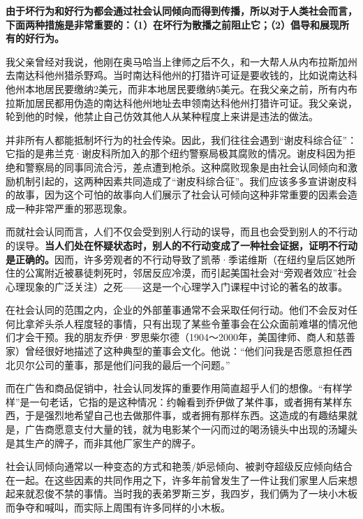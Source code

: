 \textbf{由于坏行为和好行为都会通过社会认同倾向而得到传播，所以对于人类社会而言，下面两种措施是非常重要的：（1）在坏行为散播之前阻止它；（2）倡导和展现所有的好行为。}
\par

我父亲曾经对我说，他刚在奥马哈当上律师之后不久，和一大帮人从内布拉斯加州去南达科他州猎杀野鸡。当时南达科他州的打猎许可证是要收钱的，比如说南达科他州本地居民要缴纳2美元，而非本地居民要缴纳5美元。在我父亲之前，所有内布拉斯加居民都用伪造的南达科他州地址去申领南达科他州打猎许可证。我父亲说，轮到他的时候，他禁止自己仿效其他人从某种程度上来讲是违法的做法。
\par

并非所有人都能抵制坏行为的社会传染。因此，我们往往会遇到“谢皮科综合征”：它指的是弗兰克·谢皮科所加入的那个纽约警察局极其腐败的情况。谢皮科因为拒绝和警察局的同事同流合污，差点遭到枪杀。这种腐败现象是由社会认同倾向和激励机制引起的，这两种因素共同造成了“谢皮科综合征”。我们应该多多宣讲谢皮科的故事，因为这个可怕的故事向人们展示了社会认可倾向这种非常重要的因素会造成一种非常严重的邪恶现象。
\par

而就社会认同而言，人们不仅会受到别人行动的误导，而且也会受到别人的不行动的误导。\textbf{当人们处在怀疑状态时，别人的不行动变成了一种社会证据，证明不行动是正确的。}因而，许多旁观者的不行动导致了凯蒂·季诺维斯（在纽约皇后区她所住的公寓附近被暴徒刺死时，邻居反应冷漠，而引起美国社会对“旁观者效应”社会心理现象的广泛关注）之死——这是一个心理学入门课程中讨论的著名的故事。
\par

在社会认同的范围之内，企业的外部董事通常不会采取任何行动。他们不会反对任何比拿斧头杀人程度轻的事情，只有出现了某些令董事会在公众面前难堪的情况他们才会干预。我的朋友乔伊·罗思柴尔德（1904～2000年，美国律师、商人和慈善家）曾经很好地描述了这种典型的董事会文化。他说：“他们问我是否愿意担任西北贝尔公司的董事，那是他们问我的最后一个问题。”
\par

而在广告和商品促销中，社会认同发挥的重要作用简直超乎人们的想像。“有样学样”是一句老话，它指的是这种情况：约翰看到乔伊做了某件事，或者拥有某样东西，于是强烈地希望自己也去做那件事，或者拥有那样东西。这造成的有趣结果就是，广告商愿意支付大量的钱，就为电影某个一闪而过的喝汤镜头中出现的汤罐头是其生产的牌子，而非其他厂家生产的牌子。
\par

社会认同倾向通常以一种变态的方式和艳羡/妒忌倾向、被剥夺超级反应倾向结合在一起。在这些因素的共同作用之下，许多年前曾发生了一件让我们家里人后来想起来就忍俊不禁的事情。当时我的表弟罗斯三岁，我四岁，我们俩为了一块小木板而争夺和喊叫，而实际上周围有许多同样的小木板。
\par

